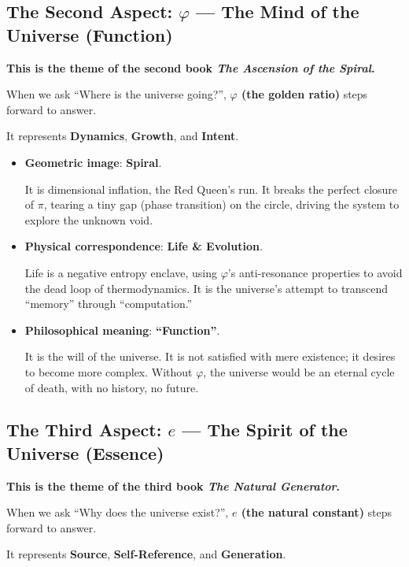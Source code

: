 \subsection{The Second Aspect: $\varphi$ --- The Mind of the Universe (Function)}

\textbf{This is the theme of the second book \textit{The Ascension of the Spiral}.}

When we ask ``Where is the universe going?'', \textbf{$\varphi$ (the golden ratio)} steps forward to answer.

It represents \textbf{Dynamics}, \textbf{Growth}, and \textbf{Intent}.

\begin{itemize}
\item \textbf{Geometric image}: \textbf{Spiral}.

    It is dimensional inflation, the Red Queen's run. It breaks the perfect closure of $\pi$, tearing a tiny gap (phase transition) on the circle, driving the system to explore the unknown void.

\item \textbf{Physical correspondence}: \textbf{Life \& Evolution}.

    Life is a negative entropy enclave, using $\varphi$'s anti-resonance properties to avoid the dead loop of thermodynamics. It is the universe's attempt to transcend ``memory'' through ``computation.''

\item \textbf{Philosophical meaning}: \textbf{``Function''}.

    It is the will of the universe. It is not satisfied with mere existence; it desires to become more complex. Without $\varphi$, the universe would be an eternal cycle of death, with no history, no future.
\end{itemize}

\subsection{The Third Aspect: $e$ --- The Spirit of the Universe (Essence)}

\textbf{This is the theme of the third book \textit{The Natural Generator}.}

When we ask ``Why does the universe exist?'', \textbf{$e$ (the natural constant)} steps forward to answer.

It represents \textbf{Source}, \textbf{Self-Reference}, and \textbf{Generation}.

